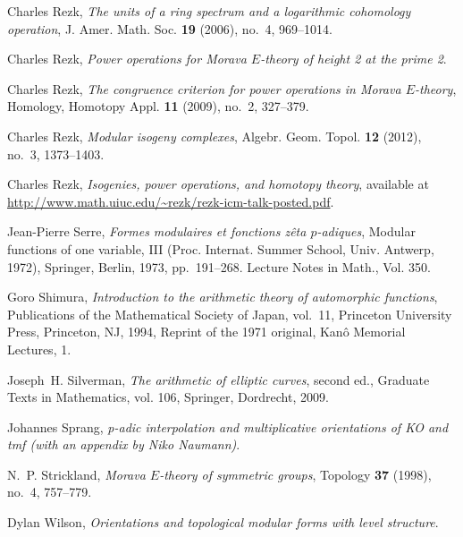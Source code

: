\documentclass{gtpart}
\theoremstyle{definition}
\theoremstyle{remark}
\renewcommand{\=}{\approx}
\renewcommand{\-}{\sim}
\numberwithin{equation}{section}
\begin{document}
\begin{thebibliography}
Charles Rezk, \emph{The units of a ring spectrum and a logarithmic cohomology
  operation}, J. Amer. Math. Soc. \textbf{19} (2006), no.~4, 969--1014.

Charles Rezk, \emph{Power operations for {M}orava {$E$}-theory of height 2 at 
  the prime 2}. 

Charles Rezk, \emph{The congruence criterion for power operations in {M}orava
  {$E$}-theory}, Homology, Homotopy Appl. \textbf{11} (2009), no.~2, 327--379.

Charles Rezk, \emph{Modular isogeny complexes}, Algebr. Geom. Topol. \textbf{12}
  (2012), no.~3, 1373--1403. 

Charles Rezk, \emph{Isogenies, power operations, and homotopy theory},
  available at \href{http://www.math.uiuc.edu/~rezk/rezk-icm-talk-posted.pdf}
  {http://www.math.uiuc.edu/\textasciitilde rezk/rezk-icm-talk-posted.pdf}.

Jean-Pierre Serre, \emph{Formes modulaires et fonctions z\^eta {$p$}-adiques},
  Modular functions of one variable, {III} ({P}roc. {I}nternat. {S}ummer
  {S}chool, {U}niv. {A}ntwerp, 1972), Springer, Berlin, 1973, pp.~191--268.
  Lecture Notes in Math., Vol. 350. 

Goro Shimura, \emph{Introduction to the arithmetic theory of automorphic
  functions}, Publications of the Mathematical Society of Japan, vol.~11,
  Princeton University Press, Princeton, NJ, 1994, Reprint of the 1971
  original, Kan{\^o} Memorial Lectures, 1. 

Joseph~H. Silverman, \emph{The arithmetic of elliptic curves}, second ed.,
  Graduate Texts in Mathematics, vol. 106, Springer, Dordrecht, 2009.

Johannes Sprang, \emph{p-adic interpolation and multiplicative orientations of
  {KO} and tmf (with an appendix by {N}iko {N}aumann)}. 

N.~P. Strickland, \emph{Morava {$E$}-theory of symmetric groups}, Topology
  \textbf{37} (1998), no.~4, 757--779. 

Dylan Wilson, \emph{Orientations and topological modular forms with level 
  structure}. 


\end{thebibliography}
\end{document}
